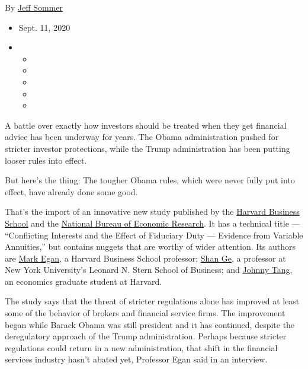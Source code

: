 By \href{https://www.nytimes3xbfgragh.onion/by/jeff-sommer}{Jeff Sommer}

\begin{itemize}
\item
  Sept. 11, 2020
\item
  \begin{itemize}
  \item
  \item
  \item
  \item
  \item
  \end{itemize}
\end{itemize}

A battle over exactly how investors should be treated when they get
financial advice has been underway for years. The Obama administration
pushed for stricter investor protections, while the Trump administration
has been putting looser rules into effect.

But here's the thing: The tougher Obama rules, which were never fully
put into effect, have already done some good.

That's the import of an innovative new study published by the
\href{https://www.hbs.edu/faculty/Publication\%20Files/WP21-018rev8-28-20_d683a777-2c59-4ce5-859d-6baad6af7860.pdf}{Harvard
Business School} and the
\href{https://www.nber.org/papers/w27577\#:~:text=Our\%20results\%20indicate\%20that\%20variable,when\%20dealing\%20with\%20retirement\%20accounts.}{National
Bureau of Economic Research}. It has a technical title --- ``Conflicting
Interests and the Effect of Fiduciary Duty --- Evidence from Variable
Annuities,'' but contains nuggets that are worthy of wider attention.
Its authors are
\href{https://www.hbs.edu/faculty/Pages/profile.aspx?facId=774513}{Mark
Egan}, a Harvard Business School professor;
\href{https://www.stern.nyu.edu/faculty/bio/shan-ge}{Shan Ge}, a
professor at New York University's Leonard N. Stern School of Business;
and \href{https://scholar.harvard.edu/johnnytang/home}{Johnny Tang}, an
economics graduate student at Harvard.

The study says that the threat of stricter regulations alone has
improved at least some of the behavior of brokers and financial service
firms. The improvement began while Barack Obama was still president and
it has continued, despite the deregulatory approach of the Trump
administration. Perhaps because stricter regulations could return in a
new administration, that shift in the financial services industry hasn't
abated yet, Professor Egan said in an interview.

